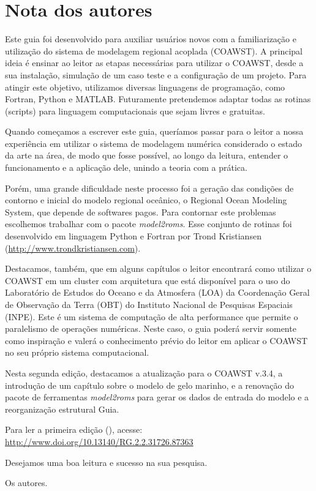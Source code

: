 \chapter*{Nota dos autores}
\bigskip
\noindent Este guia foi desenvolvido para auxiliar usuários novos com a familiarização e utilização do sistema 
          de modelagem regional acoplada (COAWST). A principal ideia é ensinar ao leitor as etapas necessárias 
          para utilizar o COAWST, desde a sua instalação, simulação de um caso teste e a configuração de um 
          projeto. Para atingir este objetivo, utilizamos diversas linguagens de programação, como Fortran, 
          Python e MATLAB. Futuramente pretendemos adaptar todas as rotinas (scripts) para linguagem computacionais 
          que sejam livres e gratuitas.
\bigskip

\noindent Quando começamos a escrever este guia, queríamos passar para o leitor a nossa experiência em utilizar o 
          sistema de modelagem numérica considerado o estado da arte na área, de modo que fosse possível, ao longo 
          da leitura, entender o funcionamento e a aplicação dele, unindo a teoria com a prática.
\bigskip

\noindent Porém, uma grande dificuldade neste processo foi a geração das condições de contorno e inicial do modelo 
          regional oceânico, o Regional Ocean Modeling System, que depende de softwares pagos. Para contornar este 
          problemas escolhemos trabalhar com o pacote \textit{model2roms}. Esse conjunto de rotinas foi desenvolvido 
          em linguagem Python e Fortran por Trond Kristiansen 
          (\textcolor{bleu_cite}{\href{http://www.trondkristiansen.com}{http://www.trondkristiansen.com}}).
\bigskip

\noindent Destacamos, também, que em alguns capítulos o leitor encontrará como utilizar o COAWST em um cluster com
          arquitetura que está disponível para o uso do Laboratório de Estudos do Oceano e da Atmosfera (LOA) da Coordenação
          Geral de Observação da Terra (OBT) do Instituto Nacional de Pesquisas Espaciais (INPE). Este é um sistema de 
          computação de alta performance que permite o paralelismo de operações numéricas. Neste caso, o guia poderá servir 
          somente como inspiração e valerá o conhecimento prévio do leitor em aplicar o COAWST no seu próprio sistema computacional.
\bigskip

\noindent Nesta segunda edição, destacamos a atualização para o COAWST v.3.4, a introdução de um capítulo sobre
          o modelo de gelo marinho, e a renovação do pacote de ferramentas \textit{model2roms} para 
          gerar os dados de entrada do modelo e a reorganização estrutural Guia.
\bigskip

\noindent Para ler a primeira edição (\cite{Sutil2018}), acesse: \textcolor{bleu_cite}{\href{http://www.doi.org/10.13140/RG.2.2.31726.87363}{http://www.doi.org/10.13140/RG.2.2.31726.87363}}
\bigskip

\noindent Desejamos uma boa leitura e sucesso na sua pesquisa.
\begin{flushright}
\noindent Os autores.
\end{flushright}
